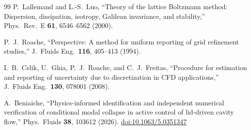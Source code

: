\documentclass[11pt,a4paper]{article}
\begin{document}
\begin{thebibliography}{99}
P.~Lallemand and L.-S.~Luo,
``Theory of the lattice Boltzmann method: Dispersion, dissipation, isotropy,
Galilean invariance, and stability,'' Phys.\ Rev.\ E \textbf{61}, 6546--6562
(2000).

P.~J.~Roache,
``Perspective: A method for uniform reporting of grid refinement studies,''
J.\ Fluids Eng.\ \textbf{116}, 405--413 (1994).

I.~B.~Celik, U.~Ghia, P.~J.~Roache, and C.~J.~Freitas,
``Procedure for estimation and reporting of uncertainty due to discretization in
CFD applications,'' J.\ Fluids Eng.\ \textbf{130}, 078001 (2008).

A.~Beniaiche,
``Physics-informed identification and independent numerical verification of
conditional modal collapse in active control of lid-driven cavity flow,''
Phys.\ Fluids \textbf{38}, 103612 (2026).
\href{https://doi.org/10.1063/5.0351347}{doi:10.1063/5.0351347}

\end{thebibliography}
\end{document}
